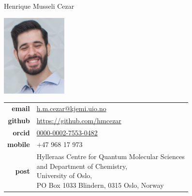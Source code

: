\documentclass[10pt]{article}
\begin{document}
\reversemarginpar
{\selectfont \LARGE Henrique Musseli Cezar}\\[0.5cm]

\begin{minipage}[t]{2.5in}
\hspace{35pt}
\includegraphics[width=1.3in,valign=c]{images/henrique2.jpg}
\end{minipage}
\begin{minipage}[t]{3in}
\begin{tabular}{rl}
{\bf email} & \href{mailto:h.m.cezar@kjemi.uio.no}{\href{mailto:h.m.cezar@kjemi.uio.no}{h.m.cezar@kjemi.uio.no}}\\[0.05in]
{\bf github} & \href{https://github.com/hmcezar}{https://github.com/hmcezar}\\[0.05in]
{\bf orcid} & \href{https://orcid.org/0000-0002-7553-0482}{0000-0002-7553-0482}\\[0.05in]
{\bf mobile} & +47 968 17 973\\[0.05in]
{\bf post} & 
\parbox[t]{3.0in}{
  Hylleraas Centre for Quantum Molecular Sciences\\
  and Department of Chemistry, \\
  University of Oslo, \\
  PO Box 1033 Blindern, 0315 Oslo, Norway}
\end{tabular}
\end{minipage}

\vspace{15pt} 

\noindent{}

\end{document}
